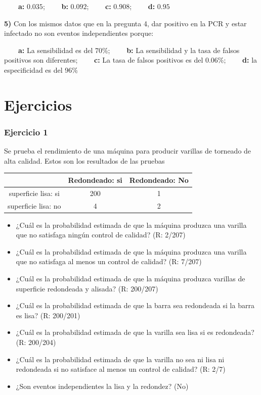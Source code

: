 \documentclass[
]{book}
\begin{document}
\textbf{\(\qquad\)a:} \(0.035\); \textbf{\(\qquad\)b:} \(0.092\); \textbf{\(\qquad\)c:} \(0.908\); \textbf{\(\qquad\)d:} \(0.95\)

\textbf{5)} Con los mismos datos que en la pregunta 4, dar positivo en la PCR y estar infectado no son eventos independientes porque:

\textbf{\(\qquad\)a:} La sensibilidad es del 70\%; \textbf{\(\qquad\)b:} La sensibilidad y la tasa de falsos positivos son diferentes; \textbf{\(\qquad\)c:} La tasa de falsos positivos es del 0.06\%; \textbf{\(\qquad\)d:} la especificidad es del 96\%

\hypertarget{ejercicios-2}{%
\section{Ejercicios}\label{ejercicios-2}}

\hypertarget{ejercicio-1-1}{%
\subsubsection{Ejercicio 1}\label{ejercicio-1-1}}

Se prueba el rendimiento de una máquina para producir varillas de torneado de alta calidad. Estos son los resultados de las pruebas

\begin{longtable}[]{@{}ccc@{}}
\toprule\noalign{}
& Redondeado: si & Redondeado: No \\
\midrule\noalign{}
\endhead
\bottomrule\noalign{}
\endlastfoot
superficie lisa: si & 200 & 1 \\
superficie lisa: no & 4 & 2 \\
\end{longtable}

\begin{itemize}
\item
  ¿Cuál es la probabilidad estimada de que la máquina produzca una varilla que no satisfaga ningún control de calidad? (R: 2/207)
\item
  ¿Cuál es la probabilidad estimada de que la máquina produzca una varilla que no satisfaga al menos un control de calidad? (R: 7/207)
\item
  ¿Cuál es la probabilidad estimada de que la máquina produzca varillas de superficie redondeada y alisada? (R: 200/207)
\item
  ¿Cuál es la probabilidad estimada de que la barra sea redondeada si la barra es lisa? (R: 200/201)
\item
  ¿Cuál es la probabilidad estimada de que la varilla sea lisa si es redondeada? (R: 200/204)
\item
  ¿Cuál es la probabilidad estimada de que la varilla no sea ni lisa ni redondeada si no satisface al menos un control de calidad? (R: 2/7)
\item
  ¿Son eventos independientes la lisa y la redondez? (No)
\end{itemize}
\end{document}
